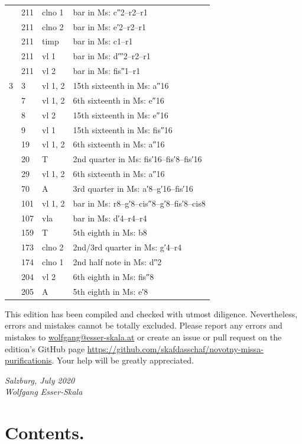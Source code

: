 \documentclass[parskip=full]{scrreprt}
\newif\iftemplate\templatetrue
\begin{document}
\begin{longtable}{lll L{10cm}}
	  & 211 & clno 1  & bar in Ms: c″2–r2–r1 \\
	  & 211 & clno 2  & bar in Ms: e′2–r2–r1 \\
	  & 211 & timp    & bar in Ms: c1–r1 \\
	  & 211 & vl 1    & bar in Ms: d′′′2–r2–r1 \\
	  & 211 & vl 2    & bar in Ms: fis″1–r1 \\
	3 & 3   & vl 1, 2 & 15th sixteenth in Ms: a″16 \\
	  & 7   & vl 1, 2 & 6th sixteenth in Ms: e″16 \\
	  & 8   & vl 2    & 15th sixteenth in Ms: e″16 \\
	  & 9   & vl 1    & 15th sixteenth in Ms: fis″16 \\
	  & 19  & vl 1, 2 & 6th sixteenth in Ms: a″16 \\
	  & 20  & T       & 2nd quarter in Ms: fis′16–fis′8–fis′16 \\
	  & 29  & vl 1, 2 & 6th sixteenth in Ms: a″16 \\
	  & 70  & A       & 3rd quarter in Ms: a′8–g′16–fis′16 \\
	  & 101 & vl 1, 2 & bar in Ms: r8–g′8–cis″8–g′8–fis′8–cis8 \\
	  & 107 & vla     & bar in Ms: d′4–r4–r4 \\
	  & 159 & T       & 5th eighth in Ms: b8 \\
	  & 173 & clno 2  & 2nd/3rd quarter in Ms: g′4–r4 \\
	  & 174 & clno 1  & 2nd half note in Ms: d″2 \\
	  & 204 & vl 2    & 6th eighth in Ms: fis″8 \\
	  & 205 & A       & 5th eighth in Ms: e′8 \\
	\bottomrule
\end{longtable}


This edition has been compiled and checked with utmost diligence. Nevertheless, errors and mistakes cannot be totally excluded. Please report any errors and mistakes to \url{wolfgang@esser-skala.at} or create an issue or pull request on the edition’s GitHub page \url{https://github.com/skafdasschaf/novotny-missa-purificationis}. Your help will be greatly appreciated.

\bigskip
\textit{Salzburg, July 2020\\
Wolfgang Esser-Skala}

\cleardoublepage
\chapter*{Contents.}


\cleardoublepage
\fi

\iftemplate

\fi
\end{document}
